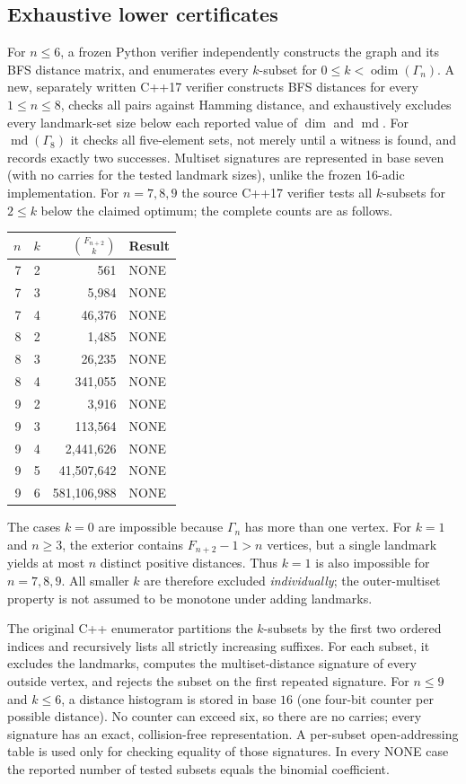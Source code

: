 \documentclass[10pt,a4paper]{article}
\newcommand{\odim}{\operatorname{odim}}
\newcommand{\md}{\operatorname{md}}
\newcommand{\G}{\Gamma}
\begin{document}
\subsection{Exhaustive lower certificates}\label{sec:exhaust}
For $n\le6$, a frozen Python verifier independently constructs the graph and
its BFS distance matrix, and enumerates every $k$-subset for $0\le k<\odim(\G_n)$.
A new, separately written C++17 verifier constructs BFS distances for every
$1\le n\le8$, checks all pairs against Hamming distance, and exhaustively
excludes every landmark-set size below each reported value of $\dim$ and $\md$.
For $\md(\G_8)$ it checks all five-element sets, not merely until a witness
is found, and records exactly two successes. Multiset signatures are represented
in base seven (with no carries for the tested landmark sizes), unlike the frozen
16-adic implementation.
For $n=7,8,9$ the source C++17 verifier tests all $k$-subsets for $2\le k$ below
the claimed optimum; the complete counts are as follows.
\begin{center}
\begin{tabular}{@{}rrrl@{}}\toprule
$n$ & $k$ & $\binom{F_{n+2}}{k}$ & Result \\\midrule
7 & 2 & 561 & NONE \\
7 & 3 & 5,984 & NONE \\
7 & 4 & 46,376 & NONE \\
8 & 2 & 1,485 & NONE \\
8 & 3 & 26,235 & NONE \\
8 & 4 & 341,055 & NONE \\
9 & 2 & 3,916 & NONE \\
9 & 3 & 113,564 & NONE \\
9 & 4 & 2,441,626 & NONE \\
9 & 5 & 41,507,642 & NONE \\
9 & 6 & 581,106,988 & NONE \\\bottomrule
\end{tabular}
\end{center}
The cases $k=0$ are impossible because $\G_n$ has more than one vertex.
For $k=1$ and $n\ge3$, the exterior contains $F_{n+2}-1>n$
vertices, but a single landmark yields at most $n$ distinct positive distances.
Thus $k=1$ is also impossible for $n=7,8,9$. All smaller $k$ are therefore excluded
\emph{individually}; the outer-multiset property is not assumed to be monotone under adding landmarks.

The original C++ enumerator partitions the $k$-subsets by the first two ordered indices and
recursively lists all strictly increasing suffixes. For each subset, it excludes the
landmarks, computes the multiset-distance signature of every outside vertex,
and rejects the subset on the first repeated signature.
For $n\le9$ and $k\le6$, a distance histogram is stored in base $16$
(one four-bit counter per possible distance). No counter can exceed six,
so there are no carries; every signature has an exact, collision-free representation.
A per-subset open-addressing table is used only for checking equality of those signatures.
In every NONE case the reported number of tested subsets equals the binomial coefficient.
\end{document}

